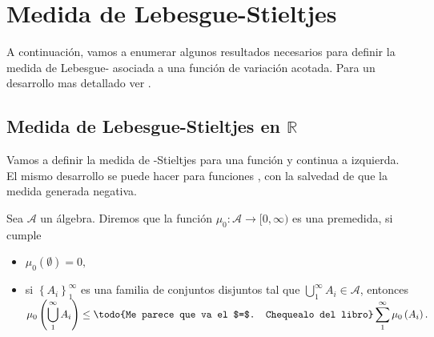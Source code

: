 \section{Medida de Lebesgue-Stieltjes}
A continuación, vamos a enumerar algunos resultados necesarios para definir la medida de Lebesgue- asociada a una función de variación acotada. Para un desarrollo mas detallado ver \cite{folland}.
\subsection{Medida de Lebesgue-Stieltjes en $\mathbb{R}$}
 
Vamos a definir la medida de -Stieltjes para una función  y continua a izquierda. El mismo desarrollo se puede hacer para funciones , con la salvedad de que la medida generada  negativa.


\begin{defi}\label{def:premedida}
Sea $\mathcal{A}$ un álgebra. Diremos que la función $\mu_0:\mathcal{A}\to [0,\infty)$ es una premedida, si cumple 
 
 
\begin{itemize}
    \item $\mu_0(\emptyset)=0,$
    \item si $\displaystyle\left\{A_i\right\}_1^\infty$ es una familia de conjuntos disjuntos tal que $\displaystyle\bigcup_1^\infty A_i\in \mathcal{A}$, entonces $\displaystyle\mu_0\left(\bigcup_1^\infty A_i\right)\leq \textrm{\todo{Me parece que va el $=$. Chequealo del libro}} \sum_1^\infty \mu_0\left(A_i\right).$ 
\end{itemize}

\end{defi}


\reversemarginpar{}


